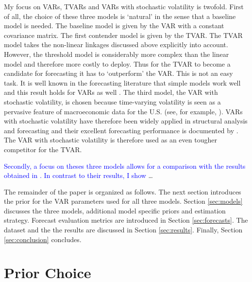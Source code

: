 \documentclass[12pt,letterpaper,fleqn]{article}           %
\begin{document}
My focus on VARs, TVARs and VARs with stochastic volatility is twofold. First of all, the choice of these three models is `natural' in the sense that a baseline model is needed. The baseline model is given by the VAR with a constant covariance matrix. The first contender model is given by the TVAR. The TVAR model takes the non-linear linkages discussed above explicitly into account. However, the threshold model is considerably more complex than the linear model and therefore more costly to deploy. %
Thus for the TVAR to become a candidate for forecasting it has to `outperform' the VAR. This is not an easy task. It is well known in the forecasting literature that simple models work well and this result holds for VARs as well \parencite{karlsson13}.%
The third model, the VAR with stochastic volatility, is chosen because time-varying volatility is seen as a pervasive feature of macroeconomic data for the U.S. (see, for example, \cite{stock02}). 
VARs with stochastic volatility have therefore been widely applied in structural analysis and forecasting and their excellent forecasting performance is documented by \textcite{alessandri17, clark15, rav14}. The VAR with stochastic volatility is therefore used as an even tougher competitor for the TVAR.

\textcolor{blue}{Secondly, a focus on theses three models allows for a comparison with the results obtained in \textcite{alessandri17}. In contrast to their results, I show} \ldots %

The remainder of the paper is organized as follows. The next section introduces the prior for the VAR parameters used for all three models. Section \ref{sec:models} discusses the three models, additional model specific priors and estimation strategy. Forecast evaluation metrics are introduced in Section \ref{sec:forecasts}. The dataset and the the results are discussed in Section \ref{sec:results}. Finally, Section \ref{sec:conclusion} concludes. %

\section{Prior Choice}
\label{sec:prior}
\end{document}
